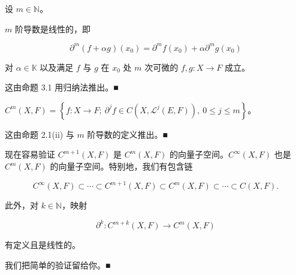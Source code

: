 \begin{remark}

设 $ m \in \mathbb{N} $。

\begin{items}
\item

$ m $ 阶导数是线性的，即

\[
\partial^{m}(f + \alpha g)(x_{0}) = \partial^{m}f(x_{0}) + \alpha\partial^{m}g(x_{0})
\]

对 $ \alpha \in \mathbb{K} $ 以及满足 $ f $ 与 $ g $ 在 $ x_{0} $ 处 $ m $ 次可微的 $ f, g : X \to F $ 成立。

\proofhead
这由命题 3.1 用归纳法推出。\nobreak\hspace{0.35em}■
\item

$ C^{m}(X, F) = \left\{ f : X \to F ;\ \partial^{j}f \in C\left( X, \mathcal{L}^{j}(E, F) \right),\ 0 \le j \le m \right\} $。

\proofhead
这由命题 2.1(ii) 与 $ m $ 阶导数的定义推出。\nobreak\hspace{0.35em}■
\item

现在容易验证 $ C^{m+1}(X, F) $ 是 $ C^{m}(X, F) $ 的向量子空间。$ C^{\infty}(X, F) $ 也是 $ C^{m}(X, F) $ 的向量子空间。特别地，我们有包含链

\[
C^{\infty}(X, F) \subset \cdots \subset C^{m+1}(X, F) \subset C^{m}(X, F) \subset \cdots \subset C(X, F) .
\]

此外，对 $ k \in \mathbb{N} $，映射

\[
\partial^{k} : C^{m+k}(X, F) \to C^{m}(X, F)
\]

有定义且是线性的。

\proofhead
我们把简单的验证留给你。\nobreak\hspace{0.35em}■
\end{items}

\end{remark}

